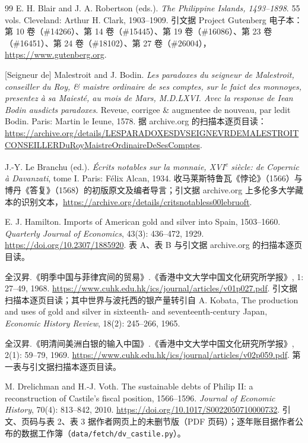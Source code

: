 \begin{thebibliography}{99}
 E. H. Blair and J. A. Robertson (eds.). \emph{The Philippine Islands, 1493--1898}. 55 vols. Cleveland: Arthur H. Clark, 1903--1909. 引文据 Project Gutenberg 电子本：第 10 卷（\#14266）、第 14 卷（\#15445）、第 19 卷（\#16086）、第 23 卷（\#16451）、第 24 卷（\#18102）、第 27 卷（\#26004），\url{https://www.gutenberg.org}.

 [Seigneur de] Malestroit and J. Bodin. \emph{Les paradoxes du seigneur de Malestroit, conseiller du Roy, \& maistre ordinaire de ses comptes, sur le faict des monnoyes, presentez à sa Maiesté, au mois de Mars, M.D.LXVI. Avec la response de Iean Bodin ausdicts paradoxes}. Reveue, corrigee \& augmentee de nouveau, par ledit Bodin. Paris: Martin le Ieune, 1578. 据 archive.org 的扫描本逐页目读：\url{https://archive.org/details/LESPARADOXESDVSEIGNEVRDEMALESTROITCONSEILLERDuRoyMaistreOrdinaireDeSesComptes}.

 J.-Y. Le Branchu (ed.). \emph{Écrits notables sur la monnaie, XVI\textsuperscript{e} siècle: de Copernic à Davanzati}, tome I. Paris: Félix Alcan, 1934. 收马莱斯特鲁瓦《悖论》（1566）与博丹《答复》（1568）的初版原文及编者导言；引文据 archive.org 上多伦多大学藏本的识别文本，\url{https://archive.org/details/critsnotabless00lebruoft}.

 E. J. Hamilton. Imports of American gold and silver into Spain, 1503--1660. \emph{Quarterly Journal of Economics}, 43(3): 436--472, 1929. \url{https://doi.org/10.2307/1885920}. 表 A、表 B 与引文据 archive.org 的扫描本逐页目读。

 全汉昇.《明季中国与菲律宾间的贸易》.《香港中文大学中国文化研究所学报》, 1: 27--49, 1968. \url{https://www.cuhk.edu.hk/ics/journal/articles/v01p027.pdf}. 引文据扫描本逐页目读；其中世界与波托西的银产量转引自 A. Kobata, The production and uses of gold and silver in sixteenth- and seventeenth-century Japan, \emph{Economic History Review}, 18(2): 245--266, 1965.

 全汉昇.《明清间美洲白银的输入中国》.《香港中文大学中国文化研究所学报》, 2(1): 59--79, 1969. \url{https://www.cuhk.edu.hk/ics/journal/articles/v02p059.pdf}. 第一表与引文据扫描本逐页目读。

 M. Drelichman and H.-J. Voth. The sustainable debts of Philip II: a reconstruction of Castile's fiscal position, 1566--1596. \emph{Journal of Economic History}, 70(4): 813--842, 2010. \url{https://doi.org/10.1017/S0022050710000732}. 引文、页码与表 2、表 3 据作者网页上的未删节版（PDF 页码）；逐年账目据作者公布的数据工作簿（\texttt{data/fetch/dv\_castile.py}）。


\end{thebibliography}
